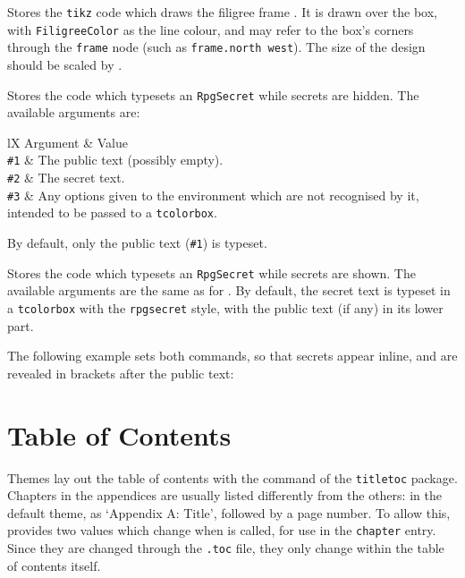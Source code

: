 		{
			Stores the \texttt{tikz} code which draws the filigree frame . It is drawn over the box, with \texttt{FiligreeColor} as the line colour, and may refer to the box's corners through the \texttt{frame} node (such as \texttt{frame.north west}). The size of the design should be scaled by .

		}
		{
			Stores the code which typesets an \texttt{RpgSecret} while secrets are hidden. The available arguments are:
			\begin{RpgTable}{lX}
				Argument & Value
				\\
				\texttt{\#1} & The public text (possibly empty).
				\\
				\texttt{\#2} & The secret text.
				\\
				\texttt{\#3} & Any options given to the environment which are not recognised by it, intended to be passed to a \texttt{tcolorbox}.
			\end{RpgTable}
			By default, only the public text (\texttt{\#1}) is typeset.
		}
		{
			Stores the code which typesets an \texttt{RpgSecret} while secrets are shown. The available arguments are the same as for . By default, the secret text is typeset in a \texttt{tcolorbox} with the \texttt{rpgsecret} style, with the public text (if any) in its lower part.

			The following example sets both commands, so that secrets appear inline, and are revealed in brackets after the public text:

		}

	\section{Table of Contents}\label{S:ThemeToc}

		Themes lay out the table of contents with the  command of the \texttt{titletoc} package. Chapters in the appendices are usually listed differently from the others: in the default theme, as `Appendix A: Title', followed by a page number. To allow this, \rpgtex{} provides two values which change when  is called, for use in the \texttt{chapter} entry. Since they are changed through the \texttt{.toc} file, they only change within the table of contents itself.

